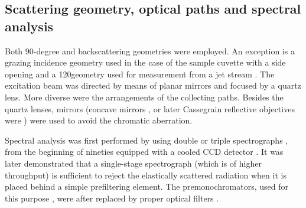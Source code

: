 \subsection{Scattering geometry, optical paths and spectral analysis}

Both 90-degree and backscattering geometries were employed. An exception is a
grazing incidence geometry used in the case of the sample cuvette with a side
opening
\parencite{Jolles1984}
and a 120\textdegree geometry used for measurement from a jet stream
\parencite{Fodor1985}.
The excitation beam was directed by means of planar mirrors and focused by a
quartz lens.
More diverse were the arrangements of the collecting paths.
Besides the quartz lenses, mirrors (concave mirrors
\cite{Blazej1977},
or later Cassegrain reflective objectives were
\cite{%
	Toyama1991,%
	Russell1995%
})
were used to avoid the chromatic aberration.

Spectral analysis was first performed by using double or triple spectrographs
\parencite{%
	Harada1975,%
	Gfrorer1993a,%
	Toyama1993%
},
from the beginning of nineties equipped with a cooled CCD detector
\parencite{%
	Gfrorer1993a,%
	Toyama1993%
}.
It was later demonstrated that a single-stage spectrograph (which is of higher
throughput) is sufficient to reject the elastically scattered radiation when it
is placed behind a simple prefiltering element.
The premonochromators, used for this purpose
\parencite{%
	Hashimoto1993,%
	Russell1995%
},
were after replaced by proper optical filters
\parencite{%
	Munro1997,%
	Bykov2013%
}.
